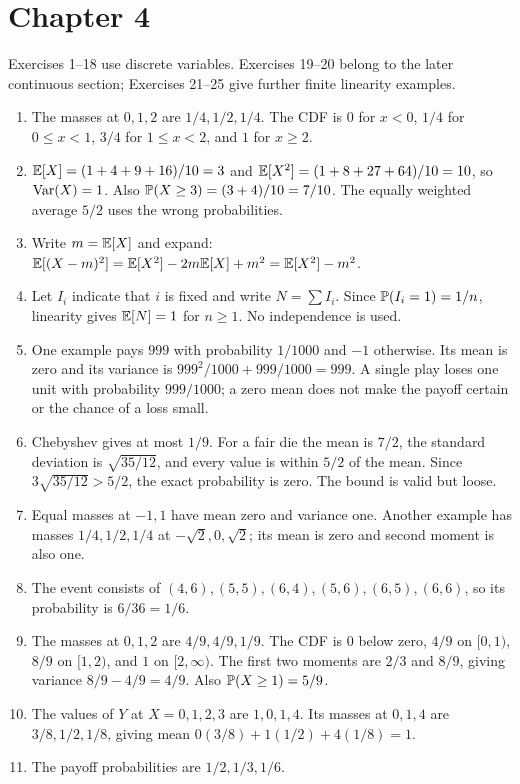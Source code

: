 \section*{Chapter 4}
Exercises 1--18 use discrete variables. Exercises 19--20 belong to
the later continuous section; Exercises 21--25 give further finite
linearity examples.
\begin{enumerate}
 \item The masses at $0,1,2$ are $1/4,1/2,1/4$. The CDF is $0$
 for $x<0$, $1/4$ for $0\le x<1$, $3/4$ for $1\le x<2$, and
 $1$ for $x\ge2$.
 \item $\E[X]=(1+4+9+16)/10=3$ and
 $\E[X^2]=(1+8+27+64)/10=10$, so $\Var(X)=1$.
 Also $\P(X\ge3)=(3+4)/10=7/10$.
 The equally weighted average $5/2$ uses the wrong probabilities.
 \item Write $m=\E[X]$ and expand:
 $\E[(X-m)^2]=\E[X^2]-2m\E[X]+m^2=\E[X^2]-m^2$.
 \item Let $I_i$ indicate that $i$ is fixed and write $N=\sum I_i$.
 Since $\P(I_i=1)=1/n$, linearity gives $\E[N]=1$ for $n\ge1$.
 No independence is used.
 \item One example pays $999$ with probability $1/1000$ and $-1$
 otherwise. Its mean is zero and its variance is
 $999^2/1000+999/1000=999$. A single play loses one unit with
 probability $999/1000$; a zero mean does not make the payoff certain
 or the chance of a loss small.
 \item Chebyshev gives at most $1/9$. For a fair die the mean is
 $7/2$, the standard deviation is $\sqrt{35/12}$, and every value
 is within $5/2$ of the mean. Since $3\sqrt{35/12}>5/2$, the exact
 probability is zero. The bound is valid but loose.
 \item Equal masses at $-1,1$ have mean zero and variance one.
 Another example has masses $1/4,1/2,1/4$ at
 $-\sqrt2,0,\sqrt2$; its mean is zero and second moment is also one.
 \item The event consists of
 $(4,6),(5,5),(6,4),(5,6),(6,5),(6,6)$, so its probability is $6/36=1/6$.
 \item The masses at $0,1,2$ are $4/9,4/9,1/9$. The CDF is
 $0$ below zero, $4/9$ on $[0,1)$, $8/9$ on $[1,2)$, and $1$
 on $[2,\infty)$. The first two moments are $2/3$ and $8/9$,
 giving variance $8/9-4/9=4/9$. Also $\P(X\ge1)=5/9$.
 \item The values of $Y$ at $X=0,1,2,3$ are $1,0,1,4$.
 Its masses at $0,1,4$ are $3/8,1/2,1/8$, giving mean
 $0(3/8)+1(1/2)+4(1/8)=1$.
 \item The payoff probabilities are $1/2,1/3,1/6$.

\end{enumerate}
